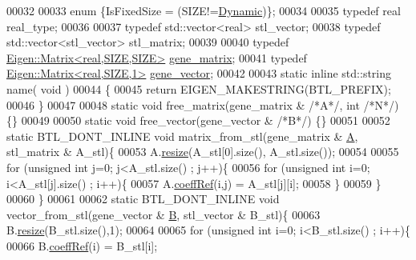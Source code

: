 \begin{DoxyCode}
00032 
00033   \textcolor{keyword}{enum} \{IsFixedSize = (SIZE!=\hyperlink{namespace_eigen_ad81fa7195215a0ce30017dfac309f0b2}{Dynamic})\};
00034 
00035   \textcolor{keyword}{typedef} real real\_type;
00036 
00037   \textcolor{keyword}{typedef} std::vector<real> stl\_vector;
00038   \textcolor{keyword}{typedef} std::vector<stl\_vector> stl\_matrix;
00039 
00040   \textcolor{keyword}{typedef} \hyperlink{group___core___module_class_eigen_1_1_matrix}{Eigen::Matrix<real,SIZE,SIZE>} \hyperlink{group___core___module_class_eigen_1_1_matrix}{gene\_matrix};
00041   \textcolor{keyword}{typedef} \hyperlink{group___core___module_class_eigen_1_1_matrix}{Eigen::Matrix<real,SIZE,1>} \hyperlink{group___core___module_class_eigen_1_1_matrix}{gene\_vector};
00042 
00043   \textcolor{keyword}{static} \textcolor{keyword}{inline} std::string name( \textcolor{keywordtype}{void} )
00044   \{
00045     \textcolor{keywordflow}{return} EIGEN\_MAKESTRING(BTL\_PREFIX);
00046   \}
00047 
00048   \textcolor{keyword}{static} \textcolor{keywordtype}{void} free\_matrix(gene\_matrix & \textcolor{comment}{/*A*/}, \textcolor{keywordtype}{int} \textcolor{comment}{/*N*/}) \{\}
00049 
00050   \textcolor{keyword}{static} \textcolor{keywordtype}{void} free\_vector(gene\_vector & \textcolor{comment}{/*B*/}) \{\}
00051 
00052   \textcolor{keyword}{static} BTL\_DONT\_INLINE \textcolor{keywordtype}{void} matrix\_from\_stl(gene\_matrix & \hyperlink{group___core___module_class_eigen_1_1_matrix}{A}, stl\_matrix & A\_stl)\{
00053     A.\hyperlink{class_eigen_1_1_plain_object_base_a99d9054ee2d5a40c6e00ded0265e9cea}{resize}(A\_stl[0].size(), A\_stl.size());
00054 
00055     \textcolor{keywordflow}{for} (\textcolor{keywordtype}{unsigned} \textcolor{keywordtype}{int} j=0; j<A\_stl.size() ; j++)\{
00056       \textcolor{keywordflow}{for} (\textcolor{keywordtype}{unsigned} \textcolor{keywordtype}{int} i=0; i<A\_stl[j].size() ; i++)\{
00057         A.\hyperlink{class_eigen_1_1_plain_object_base_a25626a55b26a4323565f79d1b7c48ea8}{coeffRef}(i,j) = A\_stl[j][i];
00058       \}
00059     \}
00060   \}
00061 
00062   \textcolor{keyword}{static} BTL\_DONT\_INLINE  \textcolor{keywordtype}{void} vector\_from\_stl(gene\_vector & \hyperlink{group___core___module_class_eigen_1_1_matrix}{B}, stl\_vector & B\_stl)\{
00063     B.\hyperlink{class_eigen_1_1_plain_object_base_a99d9054ee2d5a40c6e00ded0265e9cea}{resize}(B\_stl.size(),1);
00064 
00065     \textcolor{keywordflow}{for} (\textcolor{keywordtype}{unsigned} \textcolor{keywordtype}{int} i=0; i<B\_stl.size() ; i++)\{
00066       B.\hyperlink{class_eigen_1_1_plain_object_base_a25626a55b26a4323565f79d1b7c48ea8}{coeffRef}(i) = B\_stl[i];

\end{DoxyCode}
